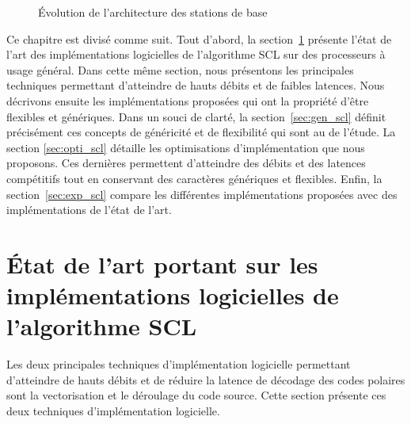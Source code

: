 \begin{figure}[ht]
{  \label{fig:bbu}
  }
  \quad\quad
  \caption{\'Evolution de l'architecture des stations de base}
  \label{fig:bs_evo}
\end{figure}

Ce chapitre est divisé comme suit. Tout d'abord, la section~\ref{sec:art_scl} présente l'état de l'art des implémentations logicielles de l'algorithme SCL sur des processeurs à usage général. Dans cette même section, nous présentons les principales techniques permettant d'atteindre de hauts débits et de faibles latences. 
Nous décrivons ensuite les implémentations proposées qui ont la propriété d'être flexibles et génériques. Dans un souci de clarté, la section~\ref{sec:gen_scl} définit précisément ces concepts de généricité et de flexibilité qui sont au \coeur de l'étude. La section \ref{sec:opti_scl} détaille les optimisations d'implémentation que nous proposons. Ces dernières permettent d'atteindre des débits et des latences compétitifs tout en conservant des caractères génériques et flexibles. Enfin, la section~\ref{sec:exp_scl} compare les différentes implémentations proposées avec des implémentations de l'état de l'art.

\section{\'Etat de l'art portant sur les implémentations logicielles de l'algorithme SCL}
\label{sec:art_scl}
Les deux principales techniques d'implémentation logicielle permettant d'atteindre de hauts débits et de réduire la latence de décodage des codes polaires sont la vectorisation et le déroulage du code source. Cette section présente ces deux techniques d'implémentation logicielle.

